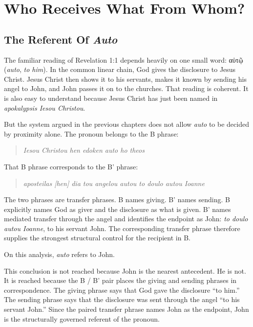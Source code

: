 \chapter{Who Receives What From Whom?}

\section{The Referent Of \textit{Auto}}

The familiar reading of Revelation 1:1 depends heavily on one small word: \textgreek{αὐτῷ} (\textit{auto}, \textit{to him}). In the common linear chain, God gives the disclosure to Jesus Christ. Jesus Christ then shows it to his servants, makes it known by sending his angel to John, and John passes it on to the churches. That reading is coherent. It is also easy to understand because Jesus Christ has just been named in \textit{apokalypsis Iesou Christou}.

But the system argued in the previous chapters does not allow \textit{auto} to be decided by proximity alone. The pronoun belongs to the B phrase:

\begin{quote}
\textit{Iesou Christou hen edoken auto ho theos}
\end{quote}

That B phrase corresponds to the B' phrase:

\begin{quote}
\textit{aposteilas [hen] dia tou angelou autou to doulo autou Ioanne}
\end{quote}

The two phrases are transfer phrases. B names giving. B' names sending. B explicitly names God as giver and the disclosure as what is given. B' names mediated transfer through the angel and identifies the endpoint as John: \textit{to doulo autou Ioanne}, to his servant John. The corresponding transfer phrase therefore supplies the strongest structural control for the recipient in B.

On this analysis, \textit{auto} refers to John.

This conclusion is not reached because John is the nearest antecedent. He is not. It is reached because the B / B' pair places the giving and sending phrases in correspondence. The giving phrase says that God gave the disclosure ``to him.'' The sending phrase says that the disclosure was sent through the angel ``to his servant John.'' Since the paired transfer phrase names John as the endpoint, John is the structurally governed referent of the pronoun.


